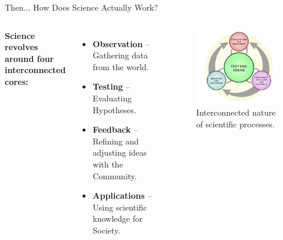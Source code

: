 \begin{frame}{Then... How Does Science Actually Work?}
	\begin{columns}

		\textbf{Science revolves around four interconnected cores:}

		\vspace{0.3cm}
		\begin{itemize}
			\item \textbf{Observation} – Gathering data from the world.
			\item \textbf{Testing} – Evaluating Hypotheses.
			\item \textbf{Feedback} – Refining and adjusting ideas with the Community.
			\item \textbf{Applications} – Using scientific knowledge for Society.
		\end{itemize}

		\begin{figure}
			\centering
			\includegraphics[width=\textwidth]{Figures/canvas.png}
			\caption{Interconnected nature of scientific processes. \cite{Science}}
		\end{figure}

	\end{columns}
\end{frame}

